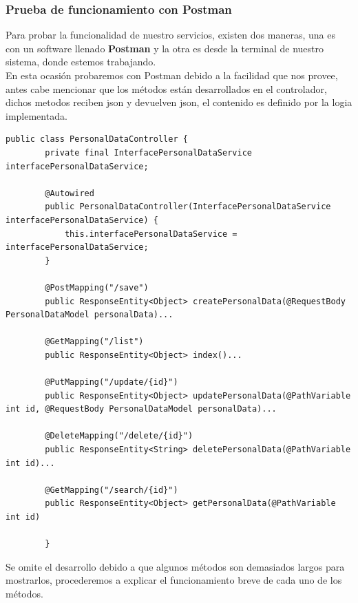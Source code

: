 	\subsubsection{Prueba de funcionamiento con Postman}
	Para probar la funcionalidad de nuestro servicios, existen dos maneras, una es con un software llenado \textbf{Postman} y la otra es desde la terminal de nuestro sistema, donde estemos trabajando.\\
	En esta ocasión probaremos con Postman debido a la facilidad que nos provee, antes cabe mencionar que los métodos están desarrollados en el controlador, dichos metodos reciben json y devuelven json, el contenido es definido por la logia implementada.
	\begin{lstlisting}[style=JavaStyle, caption=Ejemplo de metodos desarrollados del lado del controlador, label=lst:java]
		public class PersonalDataController {
		private final InterfacePersonalDataService interfacePersonalDataService;
		
		@Autowired
		public PersonalDataController(InterfacePersonalDataService interfacePersonalDataService) {
			this.interfacePersonalDataService = interfacePersonalDataService;
		}
		
		@PostMapping("/save")
		public ResponseEntity<Object> createPersonalData(@RequestBody PersonalDataModel personalData)...
		
		@GetMapping("/list")
		public ResponseEntity<Object> index()...
	
		@PutMapping("/update/{id}")
		public ResponseEntity<Object> updatePersonalData(@PathVariable int id, @RequestBody PersonalDataModel personalData)...
		
		@DeleteMapping("/delete/{id}")
		public ResponseEntity<String> deletePersonalData(@PathVariable int id)...
		
		@GetMapping("/search/{id}")
		public ResponseEntity<Object> getPersonalData(@PathVariable int id)
	
		}
	\end{lstlisting}
	Se omite el desarrollo debido a que algunos métodos son demasiados largos para mostrarlos, procederemos a explicar el funcionamiento breve de cada uno de los métodos.
